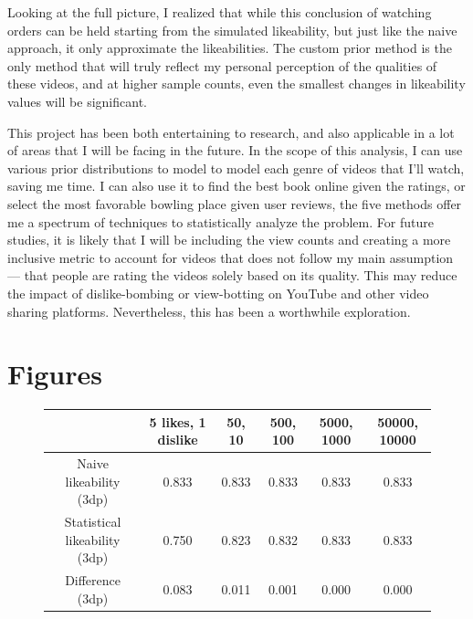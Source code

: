 \documentclass[a4paper,11pt]{article}
\begin{document}
Looking at the full picture, I realized that while this conclusion of watching orders can be held starting from the simulated likeability, but just like the naive approach, it only approximate the likeabilities. The custom prior method is the only method that will truly reflect my personal perception of the qualities of these videos, and at higher sample counts, even the smallest changes in likeability values will be significant.

This project has been both entertaining to research, and also applicable in a lot of areas that I will be facing in the future. In the scope of this analysis, I can use various prior distributions to model to model each genre of videos that I'll watch, saving me time. I can also use it to find the best book online given the ratings, or select the most favorable bowling place given user reviews, the five methods offer me a spectrum of techniques to statistically analyze the problem. For future studies, it is likely that I will be including the view counts and creating a more inclusive metric to account for videos that does not follow my main assumption --- that people are rating the videos solely based on its quality. This may reduce the  impact of dislike-bombing or view-botting on YouTube and other video sharing platforms. Nevertheless, this has been a worthwhile exploration.

\newpage
\printbibliography


\newpage
\appendix
{}
\section{Figures}

\begin{figure}[H]
    \centering
    \begin{tabular}{c|c|c|c|c|c}
        & 5 likes, 1 dislike & 50, 10 & 500, 100 & 5000, 1000 & 50000, 10000 \\
        \hline
        \hline
        Naive likeability (3dp) & 0.833 & 0.833 & 0.833 & 0.833 & 0.833\\ \hline
        Statistical likeability (3dp) & 0.750 & 0.823 & 0.832 & 0.833 & 0.833\\ \hline
        Difference (3dp) & 0.083 & 0.011 & 0.001 & 0.000 & 0.000
    \end{tabular}
    \label{apd:acc}
\end{figure}
\end{document}
